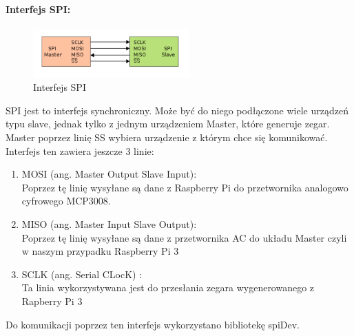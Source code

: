 \paragraph{Interfejs SPI:}
\begin{figure}[h]
	\centering
	\includegraphics[width=6cm]{SPI.png}
	\caption{Interfejs SPI}
\end{figure}
SPI jest to interfejs synchroniczny. Może być do niego podłączone wiele urządzeń typu slave, jednak tylko z jednym urządzeniem Master, które generuje zegar. Master poprzez linię SS wybiera urządzenie z którym chce się komunikować.  \\
Interfejs ten zawiera jeszcze 3 linie:
\begin{enumerate} 
\item MOSI (ang. Master Output Slave Input): \\
Poprzez tę linię wysyłane są dane z Raspberry Pi do przetwornika analogowo cyfrowego MCP3008.
\item MISO (ang. Master Input Slave Output):\\
Poprzez tę linię wysyłane są dane z przetwornika AC do układu Master czyli w naszym przypadku Raspberry Pi 3
\item SCLK (ang. Serial CLocK) :\\
Ta linia wykorzystywana jest do przesłania zegara wygenerowanego z Rapberry Pi 3
\end{enumerate}
Do komunikacji poprzez ten interfejs wykorzystano bibliotekę spiDev. \\

